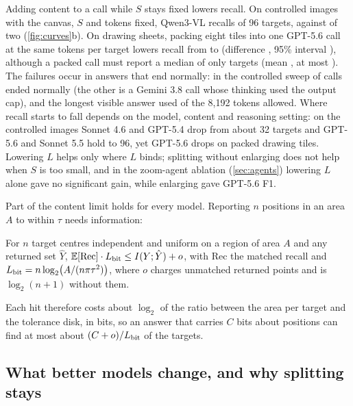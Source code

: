 Adding content to a call while $S$ stays fixed lowers recall. On controlled images with the canvas, $S$ and tokens fixed, Qwen3-VL recalls \XcapNlastqwenThreevl{} of 96 targets, against \XcapNtwoqwenThreevl{} of two (\cref{fig:curves}b). On drawing sheets, packing eight tiles into one GPT-5.6 call at the same tokens per target lowers recall from \XmosRgptFiveSixkOne{} to \XmosRgptFiveSixkEight{} (difference \XmosdRgptFiveSixkEight, 95\% interval \XmosdRCIgptFiveSixkEight), although a packed call must report a median of only \CpackMedian{} targets (mean \CpackMean, at most \CpackMax). The failures occur in answers that end normally: in the controlled sweep \CcapNormal{} of \CcapCalls{} calls ended normally (the other is a Gemini 3.8 call whose thinking used the output cap), and the longest visible answer used \CcapMaxOut{} of the 8{,}192 tokens allowed. Where recall starts to fall depends on the model, content and reasoning setting: on the controlled images Sonnet 4.6 and GPT-5.4 drop from about 32 targets and GPT-5.6 and Sonnet 5.5 hold to 96, yet GPT-5.6 drops on packed drawing tiles. Lowering $L$ helps only where $L$ binds; splitting without enlarging does not help when $S$ is too small, and in the zoom-agent ablation (\cref{sec:agents}) lowering $L$ alone gave no significant gain, while enlarging gave GPT-5.6 \UnHThreegptFiveSixOVZOVC{} F1.

Part of the content limit holds for every model. Reporting $n$ positions in an area $A$ to within $\tau$ needs information:

\begin{theorem}
\label{thm:capacity}
For $n$ target centres independent and uniform on a region of area $A$ and any returned set $\hat Y$, $\mathbb{E}[\mathrm{Rec}] \cdot L_{\mathrm{bit}} \le I(Y; \hat Y) + o$, with $\mathrm{Rec}$ the matched recall and $L_{\mathrm{bit}} = n \log_2\!\big(A/(n\pi\tau^2)\big)$, where $o$ charges unmatched returned points and is $\log_2(n+1)$ without them.
\end{theorem}

Each hit therefore costs about $\log_2$ of the ratio between the area per target and the tolerance disk, in bits, so an answer that carries $C$ bits about positions can find at most about $(C + o)/L_{\mathrm{bit}}$ of the targets.


\subsection{What better models change, and why splitting stays}


